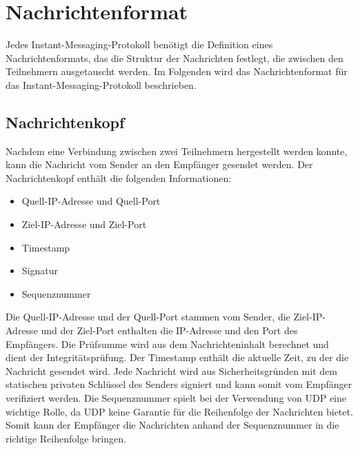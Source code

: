 \section{Nachrichtenformat}
\label{sec:nachrichtenformat}


Jedes Instant-Messaging-Protokoll benötigt die Definition eines Nachrichtenformats, das die Struktur der Nachrichten festlegt, die zwischen den Teilnehmern ausgetauscht werden. Im Folgenden wird das Nachrichtenformat für das Instant-Messaging-Protokoll beschrieben.

\subsection{Nachrichtenkopf}

Nachdem eine Verbindung zwischen zwei Teilnehmern hergestellt werden konnte, kann die Nachricht vom Sender an den Empfänger gesendet werden. Der Nachrichtenkopf enthält die folgenden Informationen:

\begin{itemize}
    \item Quell-IP-Adresse und Quell-Port
    \item Ziel-IP-Adresse und Ziel-Port
    \item Timestamp
    \item Signatur
    \item Sequenznummer
\end{itemize}

\noindent Die Quell-IP-Adresse und der Quell-Port stammen vom Sender, die Ziel-IP-Adresse und der Ziel-Port enthalten die IP-Adresse und den Port des Empfängers. Die Prüfsumme wird aus dem Nachrichteninhalt berechnet und dient der Integritätsprüfung. Der Timestamp enthält die aktuelle Zeit, zu der die Nachricht gesendet wird. Jede Nachricht wird aus Sicherheitsgründen mit dem statischen privaten Schlüssel des Senders signiert und kann somit vom Empfänger verifiziert werden. Die Sequenznummer spielt bei der Verwendung von UDP eine wichtige Rolle, da UDP keine Garantie für die Reihenfolge der Nachrichten bietet. Somit kann der Empfänger die Nachrichten anhand der Sequenznummer in die richtige Reihenfolge bringen.

